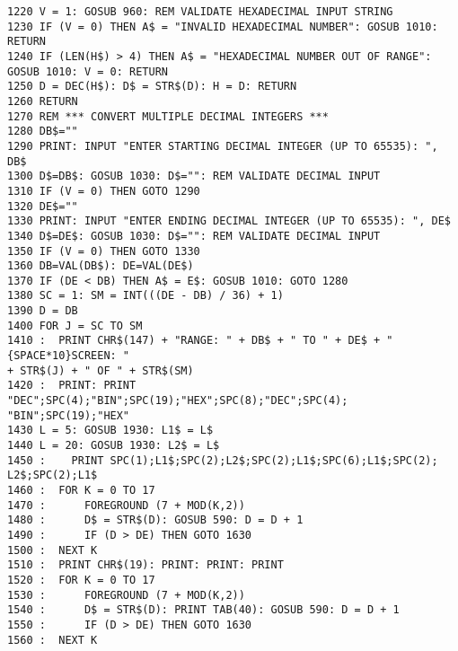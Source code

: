 \begin{tcolorbox}[colback=black,coltext=white]
\verbatimfont{\codefont}
\begin{verbatim}
1220 V = 1: GOSUB 960: REM VALIDATE HEXADECIMAL INPUT STRING
1230 IF (V = 0) THEN A$ = "INVALID HEXADECIMAL NUMBER": GOSUB 1010: RETURN
1240 IF (LEN(H$) > 4) THEN A$ = "HEXADECIMAL NUMBER OUT OF RANGE":
GOSUB 1010: V = 0: RETURN
1250 D = DEC(H$): D$ = STR$(D): H = D: RETURN
1260 RETURN
1270 REM *** CONVERT MULTIPLE DECIMAL INTEGERS ***
1280 DB$=""
1290 PRINT: INPUT "ENTER STARTING DECIMAL INTEGER (UP TO 65535): ", DB$
1300 D$=DB$: GOSUB 1030: D$="": REM VALIDATE DECIMAL INPUT
1310 IF (V = 0) THEN GOTO 1290
1320 DE$=""
1330 PRINT: INPUT "ENTER ENDING DECIMAL INTEGER (UP TO 65535): ", DE$
1340 D$=DE$: GOSUB 1030: D$="": REM VALIDATE DECIMAL INPUT
1350 IF (V = 0) THEN GOTO 1330
1360 DB=VAL(DB$): DE=VAL(DE$)
1370 IF (DE < DB) THEN A$ = E$: GOSUB 1010: GOTO 1280
1380 SC = 1: SM = INT(((DE - DB) / 36) + 1)
1390 D = DB
1400 FOR J = SC TO SM
1410 :  PRINT CHR$(147) + "RANGE: " + DB$ + " TO " + DE$ + "{SPACE*10}SCREEN: "
+ STR$(J) + " OF " + STR$(SM)
1420 :  PRINT: PRINT "DEC";SPC(4);"BIN";SPC(19);"HEX";SPC(8);"DEC";SPC(4);
"BIN";SPC(19);"HEX"
1430 L = 5: GOSUB 1930: L1$ = L$
1440 L = 20: GOSUB 1930: L2$ = L$
1450 :    PRINT SPC(1);L1$;SPC(2);L2$;SPC(2);L1$;SPC(6);L1$;SPC(2);
L2$;SPC(2);L1$
1460 :  FOR K = 0 TO 17
1470 :      FOREGROUND (7 + MOD(K,2))
1480 :      D$ = STR$(D): GOSUB 590: D = D + 1
1490 :      IF (D > DE) THEN GOTO 1630
1500 :  NEXT K
1510 :  PRINT CHR$(19): PRINT: PRINT: PRINT
1520 :  FOR K = 0 TO 17
1530 :      FOREGROUND (7 + MOD(K,2))
1540 :      D$ = STR$(D): PRINT TAB(40): GOSUB 590: D = D + 1
1550 :      IF (D > DE) THEN GOTO 1630
1560 :  NEXT K
\end{verbatim}
\end{tcolorbox}
